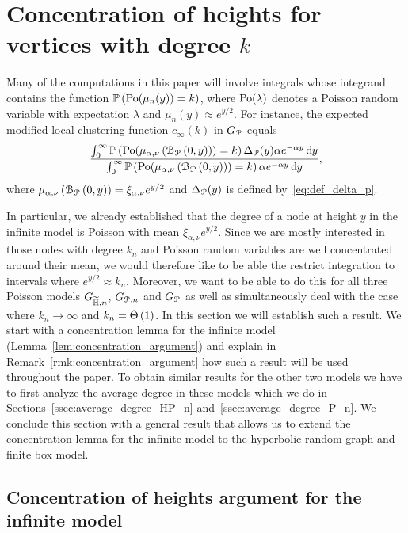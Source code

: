 \section{Concentration of heights for vertices with degree $k$}\label{sec:concentration_argument}

Many of the computations in this paper will involve integrals whose integrand contains the function $\mathbb{P}\left({\mathrm{Po}}(\mu_n(y)) = k\right)$, where ${\mathrm{Po}}(\lambda)$ denotes a Poisson random variable with expectation $\lambda$ and $\mu_n(y) \approx e^{y/2}$. For instance, the expected modified local clustering function $c_\infty(k)$ in $G_{{\mathcal P}}$ equals
\[
	\frac{\int_0^\infty \mathbb{P}\left({\mathrm{Po}}(\mu_{\alpha,\nu}\left({\mathcal B}_{{\mathcal P}}\left(0,y\right)\right)) = k\right) \Delta_{{\mathcal P}}(y) \alpha e^{-\alpha y} \operatorname{\mathrm{d}\hspace{-2pt}} y}
	{\int_0^\infty \mathbb{P}\left({\mathrm{Po}}(\mu_{\alpha,\nu}\left({\mathcal B}_{{\mathcal P}}\left(0,y\right)\right)) = k\right) \alpha e^{-\alpha y} \operatorname{\mathrm{d}\hspace{-2pt}} y},
\]
where $\mu_{\alpha,\nu}\left({\mathcal B}_{{\mathcal P}}\left(0,y\right)\right) = \xi_{\alpha,\nu} e^{y/2}$ and $\Delta_{{\mathcal P}}(y)$ is defined by~\eqref{eq:def_delta_p}. 

In particular, we already established that the degree of a node at height $y$ in the infinite model is Poisson with mean $\xi_{\alpha,\nu} e^{y/2}$. Since we are mostly interested in those nodes with degree $k_n$ and Poisson random variables are well concentrated around their mean, we would therefore like to be able the restrict integration to intervals where $e^{y/2} \approx k_n$. Moreover, we want to be able to do this for all three Poisson models $G_{\widetilde{\mathbb{H}},n}$, $G_{{\mathcal P},n}$ and $G_{{\mathcal P}}$ as well as simultaneously deal with the case where $k_n \to \infty$ and $k_n = \Theta\left(1\right)$. In this section we will establish such a result. We start with a concentration lemma for the infinite model (Lemma~\ref{lem:concentration_argument}) and explain in Remark~\ref{rmk:concentration_argument} how such a result will be used throughout the paper. To obtain similar results for the other two models we have to first analyze the average degree in these models which we do in Sections~\ref{ssec:average_degree_HP_n} and~\ref{ssec:average_degree_P_n}. We conclude this section with a general result that allows us to extend the concentration lemma for the infinite model to the hyperbolic random graph and finite box model. 

\subsection{Concentration of heights argument for the infinite model}

